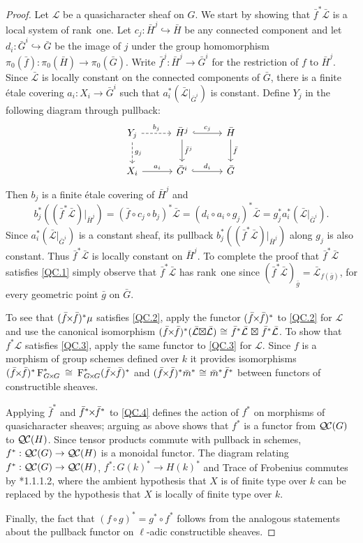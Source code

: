 \documentclass{amsart}
\theoremstyle{plain}
\theoremstyle{definition}
\theoremstyle{remark}
\newcommand{\Fq}{k}
\newcommand{\Frob}[1]{\operatorname{F}_{#1}}
\newcommand{\iso}{{\ \cong\ }}
\newcommand{\qcs}[1]{{\mathcal{#1}}}
\newcommand{\gqcs}[1]{{\mathcal{\bar #1}}}
\newcommand{\QC}{{\mathcal{Q\hskip-0.8pt C}}}
\renewcommand{\bf}{\bar{f}}
\newcommand{\bg}{\bar{g}}
\newcommand{\bm}{\bar{m}}
\newcommand{\bG}{\bar{G}}
\newcommand{\bH}{\bar{H}}
\newcommand{\tight}[3]{\hspace{-#1pt}{#2}\hspace{-#3pt}}
\newcommand{\bfxf}{\text{$\bar{f} \tight{1}{\times}{1} \bar{f}$}}
\newcommand{\GxxG}{\text{$G \tight{1}{\times}{1} G$}}
\newcommand{\LxL}{\text{$\gqcs{L} \tight{0}{\boxtimes}{0} \gqcs{L}$}}
\begin{document}
\begin{proof}
  Let $\qcs{L}$ be a quasicharacter sheaf on $G$. We start by showing that
  $\bf^*\gqcs{L}$ is a local system of rank~one. Let $c_j :\bH^j \hookrightarrow \bH$ be any
  connected component and let $d_i : \bG^i \hookrightarrow \bG$ be the image of $j$ under the group
  homomorphism $\pi_0(\bf) : \pi_0(\bH) \to \pi_0(\bG)$.  Write $\bf^j : \bH^j \to \bG^i$
  for the restriction of $f$ to $\bH^j$.  Since $\gqcs{L}$ is locally constant on the connected
  components of $\bG$, there is a finite \'etale covering
  $a_i : X_i \to \bG^i$ such that $a_i^* (\gqcs{L}\vert_{\bG^i})$
  is constant.  Define $Y_j$ in the following diagram through pullback:
  \[
  \begin{tikzcd}[row sep=20, column sep=30]
   Y_j \dar[dashed]{g_j} \rar[dashed]{b_j} & \bH^j \dar{\bf^j} \rar[hook]{c_j} & \bH \dar{\bf} \\
   X_i \rar{a_i} & \bG^i \rar[hook]{d_i} & \bG
  \end{tikzcd}
  \]
  Then $b_j$ is a finite \'etale covering
  of $\bH^j$ and
  \[
  b_j^* \left( (\bf^* \gqcs{L})\vert_{\bH^j}\right)
  = (\bf\circ c_j \circ b_j)^*\gqcs{L}
  = (d_i\circ a_i\circ g_j)^*\gqcs{L} = g_j^* a_i^* (\gqcs{L}\vert_{\bG^i}).
  \]
  Since $a_i^* (\gqcs{L}\vert_{\bG^i})$ is a constant sheaf, its pullback
  $b_j^* \left( (\bf^*\gqcs{L})\vert_{\bH^j}\right)$ along $g_j$ is also constant.
  Thus $\bf^*\gqcs{L}$ is locally constant on
  $\bH^j$. To complete the proof that $\bf^*\gqcs{L}$ satisfies
  \ref{QC.1}
  simply observe that $\bf^*\gqcs{L}$ has rank~one since
  $(\bf^*\gqcs{L})_{\bg} = \gqcs{L}_{f(\bg)}$, for every geometric point ${\bg}$ on $\bG$.


  To see that $(\bfxf)^* \mu$ satisfies \ref{QC.2},
  apply the functor $(\bfxf)^*$
  to \ref{QC.2} for $\qcs{L}$ and use the canonical isomorphism
  $(\bfxf)^*(\LxL) \iso \bf^*\gqcs{L} \tight{-3}{\boxtimes}{-3} \bf^*\gqcs{L}$.
  To show that $f^*\qcs{L}$ satisfies
  \ref{QC.3}, apply the same functor to \ref{QC.3} for $\qcs{L}$.
  Since $f$ is a morphism of group schemes defined over $\Fq$
  it provides isomorphisms $(\bfxf)^*\Frob{\GxxG}^* \iso \Frob{\GxxG}^* (\bfxf)^*$
  and $(\bfxf)^* \bm^*\iso \bm^* \bf^*$ between functors of constructible sheaves.

  Applying $\bf^*$ and $\bf^* \tight{1}{\times}{1}\bf^*$ to \ref{QC.4} defines the action
  of $f^*$ on morphisms of quasicharacter sheaves; arguing as above shows that $f^*$ is
  a functor from $\QC(G)$ to $\QC(H)$.  Since tensor products commute with pullback in schemes,
  $f^* : \QC(G) \to \QC(H)$ is a monoidal functor.
  The diagram relating $f^* : \QC(G) \to \QC(H)$, $f^* : G(k)^* \to H(k)^*$ and Trace of Frobenius
  commutes by \cite{laumon:87a}*{1.1.1.2}, where the ambient
  hypothesis that $X$ is of finite type over $\Fq$ can be replaced by
  the hypothesis that $X$ is locally of finite type over $\Fq$.

  Finally, the fact that $(f\circ g)^* = g^* \circ f^*$ follows from the analogous
  statements about the pullback functor on $\ell$-adic constructible sheaves.
\end{proof}
\end{document}
